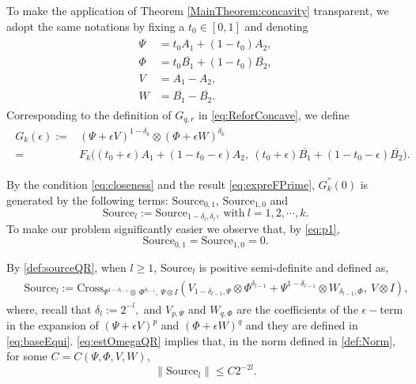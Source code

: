 \documentclass{article}
\numberwithin{equation}{section}
\begin{document}
To make the application of Theorem \ref{MainTheorem:concavity} transparent, we adopt the same notations by fixing a $t_0 \in [0, 1]$ and denoting
\begin{align}\label{def:PsiPhiVW}
\begin{split}
  \Psi &= t_0 A_1 + (1 - t_0) A_2, \\
    \Phi &= t_0 \overline{B_1} + (1 - t_0) \overline{B_2}, \\
    V &= A_1 - A_2, \\
    W &= \overline{B_1} - \overline{B_2}.
\end{split}
\end{align}
Corresponding to the definition of $G_{q, r}$ in \eqref{eq:ReforConcave}, we define
\begin{align}\label{eq:defGk}
\begin{split}
G_k(\epsilon) :=& (\Psi + \epsilon V)^{1-\delta_k} \otimes (\Phi + \epsilon W)^{\delta_k}\\
=&F_{k}\big((t_0+\epsilon)A_1+(1-t_0-\epsilon)A_2,\ (t_0+\epsilon)\overline{B_1}+(1-t_0-\epsilon)\overline{B_2}\big).
\end{split}
\end{align} 

By the condition \eqref{eq:closeness} and the result \eqref{eq:expreFPrime},  $G^{''}_k(0)$ is generated by the following terms: $\text{Source}_{0,1}$, $\text{Source}_{1,0}$ and 
\begin{equation}
\text{Source}_l:=\text{Source}_{1-\delta_l,\delta_l},\ \text{with}\ l=1,2,\cdots,k.
\end{equation}
To make our problem significantly easier we observe that, by \eqref{eq:p1},
\begin{equation}\label{eq:0source} 
\text{Source}_{0,1} = \text{Source}_{1, 0} = 0 .
\end{equation}

By \eqref{def:sourceQR}, when $l\geq 1$, $\text{Source}_{l }$ is positive semi-definite and defined as, 
\begin{align}
\begin{split}
&\text{Source}_{l }
:= \text{Cross}_{\Psi^{1-\delta_{l-1} } \otimes \ \Phi^{\delta_{l-1} }, \ \Psi \otimes I} 
\left( V_{1-\delta_{l-1},\Psi } \otimes \Phi^{\delta_{l-1} } + \Psi^{1-\delta_{l-1}} \otimes W_{\delta_{l-1},\Phi }, \ V \otimes I  \right),
\end{split}
\end{align} where, recall that $\delta_{l}:=2^{-l},$ and $V_{p,\Psi}$ and $W_{q,\Phi}$ are the coefficients of the $\epsilon-$term in the expansion of $(\Psi+\epsilon V)^p$ and $(\Phi+\epsilon W)^q$ and they are defined in \eqref{eq:baseEqui}.
\eqref{eq:estOmegaQR} implies that, in the norm defined in \eqref{def:Norm}, for some $C=C(\Psi,\Phi, V,W)$,
\begin{equation}\label{eq:sourcel}
\| \text{Source}_{l} \| \leq C 2^{-2l}.
\end{equation}
\end{document}
